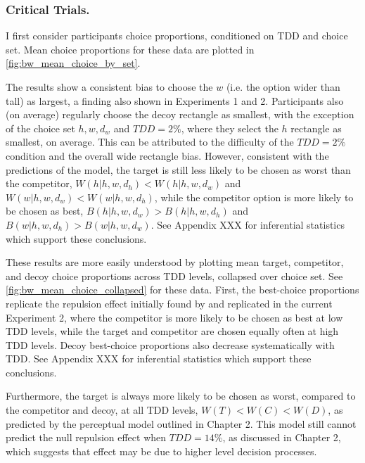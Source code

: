{{{{\subsubsection{Critical Trials.}
I first consider participants choice proportions, conditioned on TDD and choice set. Mean choice proportions for these data are plotted in \ref{fig:bw_mean_choice_by_set}. 

The results show a consistent bias to choose the $w$ (i.e. the option wider than tall) as largest, a finding also shown in Experiments 1 and 2. Participants also (on average) regularly choose the decoy rectangle as smallest, with the exception of the choice set $h,w,d_{w}$ and $TDD=2\%$, where they select the $h$ rectangle as smallest, on average. This can be attributed to the difficulty of the $TDD=2\%$ condition and the overall wide rectangle bias. However, consistent with the predictions of the model, the target is still less likely to be chosen as worst than the competitor, $W(h|{h,w,d_{h}})<W(h|{h,w,d_{w}})$ and $W(w|{h,w,d_{w}})<W(w|{h,w,d_{h}})$, while the competitor option is more likely to be chosen as best, $B(h|{h,w,d_{w}})>B(h|{h,w,d_{h}})$ and $B(w|{h,w,d_{h}})>B(w|{h,w,d_{w}})$. See Appendix XXX for inferential statistics which support these conclusions.

These results are more easily understood by plotting mean target, competitor, and decoy choice proportions across TDD levels, collapsed over choice set. See \ref{fig:bw_mean_choice_collapsed} for these data. First, the best-choice proportions replicate the repulsion effect initially found by \textcite{spektorWhenGoodLooks2018b} and replicated in the current Experiment 2, where the competitor is more likely to be chosen as best at low TDD levels, while the target and competitor are chosen equally often at high TDD levels. Decoy best-choice proportions also decrease systematically with TDD. See Appendix XXX for inferential statistics which support these conclusions. 

Furthermore, the target is always more likely to be chosen as worst, compared to the competitor and decoy, at all TDD levels, $W(T)<W(C)<W(D)$, as predicted by the perceptual model outlined in Chapter 2. This model still cannot predict the null repulsion effect when $TDD=14\%$, as discussed in Chapter 2, which suggests that effect may be due to higher level decision processes.

}}}}
